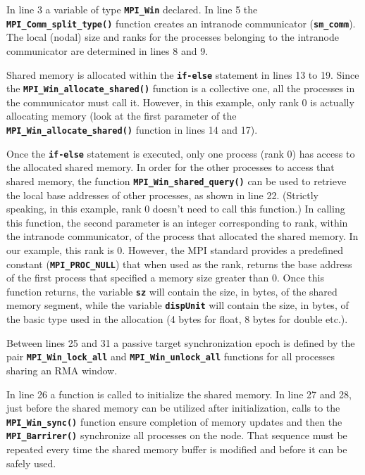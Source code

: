 \medskip

In line 3 a variable of type \textbf{\texttt{MPI\_Win}} declared. In line 5 the \textbf{\texttt{MPI\_Comm\_split\_type()}} function creates an intranode communicator (\textbf{\texttt{sm\_comm}}). The local (nodal) size and ranks for the processes belonging to the intranode communicator are determined in lines 8 and 9.

\medskip

Shared memory is allocated within the \textbf{\texttt{if-else}} statement in lines 13 to 19. Since the \textbf{\texttt{MPI\_Win\_allocate\_shared()}} function is a collective one, all the processes in the communicator must call it. However, in this example, only rank 0 is actually allocating memory (look at the first parameter of the \textbf{\texttt{MPI\_Win\_allocate\_shared()}} function in lines 14 and 17). 

\medskip

Once the \textbf{\texttt{if-else}} statement is executed, only one process (rank 0) has access to the allocated shared memory. In order for the other processes to access that shared memory, the function \textbf{\texttt{MPI\_Win\_shared\_query()}} can be used to retrieve the local base addresses of other processes, as shown in line 22. (Strictly speaking, in this example, rank 0 doesn't need to call this function.) In calling this function, the second parameter is an integer corresponding to rank, within the intranode communicator, of the process that allocated the shared memory. In our example, this rank is 0. However, the MPI standard provides a predefined constant (\textbf{\texttt{MPI\_PROC\_NULL}}) that when used as the rank, returns the base address of the first process that specified a memory size greater than 0. Once this function returns, the variable \textbf{\texttt{sz}} will contain the size, in bytes, of the shared memory segment, while the variable \textbf{\texttt{dispUnit}} will contain the size, in bytes, of the basic type used in the allocation (4 bytes for float, 8 bytes for double etc.).


\medskip

Between lines 25 and 31 a passive target synchronization epoch is defined by the pair  \textbf{\texttt{MPI\_Win\_lock\_all}} and \textbf{\texttt{MPI\_Win\_unlock\_all}} functions for all processes sharing an RMA window.

\medskip

In line 26 a function is called to initialize the shared memory. In line 27 and 28, just before the shared memory can be utilized after initialization, calls to the \textbf{\texttt{MPI\_Win\_sync()}} function ensure completion of memory updates and then the \textbf{\texttt{MPI\_Barrirer()}} synchronize all processes on the node. That sequence must be repeated every time the shared memory buffer is modified and before it can be safely used.


